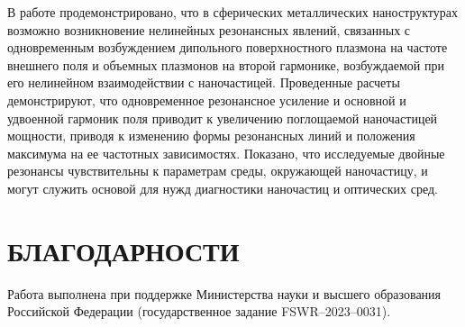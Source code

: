 \documentclass[12pt, a4paper]{article}
\begin{document}
В работе продемонстрировано, что в сферических металлических наноструктурах возможно возникновение нелинейных резонансных явлений, связанных с одновременным возбуждением дипольного поверхностного плазмона на частоте внешнего поля и объемных плазмонов на второй гармонике, возбуждаемой при его нелинейном взаимодействии с наночастицей. Проведенные расчеты демонстрируют, что одновременное резонансное усиление и основной и удвоенной гармоник поля приводит к увеличению поглощаемой наночастицей мощности, приводя к изменению  формы резонансных линий и положения максимума на ее частотных зависимостях. Показано, что исследуемые двойные резонансы чувствительны к параметрам среды, окружающей наночастицу, и могут служить основой для нужд диагностики наночастиц и оптических сред.

\section{БЛАГОДАРНОСТИ}
Работа выполнена при поддержке Министерства науки и высшего образования Российской Федерации (государственное задание FSWR–2023–0031).
\newpage
\end{document}
